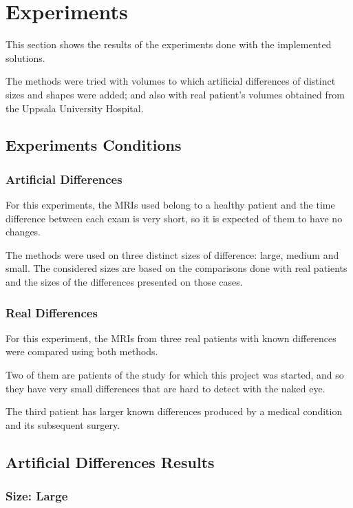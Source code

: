 \chapter{Experiments}
This section shows the results of the experiments done with the
implemented solutions. 

The methods were tried with volumes to which artificial differences of
distinct sizes and shapes were added; and also with real patient's
volumes obtained from the Uppsala University Hospital.


\section{Experiments Conditions}

\subsection{Artificial Differences}
For this experiments, the MRIs used belong to a healthy patient and
the time difference between each exam is very short, so it is expected
of them to have no changes.

The methods were used on three distinct sizes of difference: large,
medium and small. The considered sizes are based on the comparisons
done with real patients and the sizes of the differences presented on
those cases.


\subsection{Real Differences}
For this experiment, the MRIs from three real patients with known
differences were compared using both methods.

Two of them are patients of the study for which this project was
started, and so they have very small differences that are hard to
detect with the naked eye.

The third patient has larger known differences produced by a medical
condition and its subsequent surgery.


\section{Artificial Differences Results}

\subsection{Size: Large}

